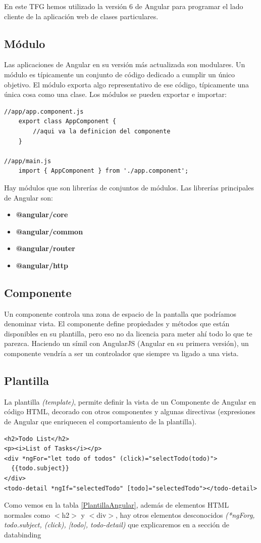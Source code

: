 En este TFG hemos utilizado la versión 6 de Angular para programar el lado cliente de la aplicación web de clases particulares.

\subsection{Módulo}
Las aplicaciones de Angular en su versión más actualizada son modulares. Un módulo es típicamente un conjunto de código dedicado a cumplir un único objetivo. El módulo exporta algo representativo de ese código, típicamente una única cosa como una clase. Los módulos se pueden exportar e importar:

\begin{lstlisting}
//app/app.component.js
    export class AppComponent {
        //aqui va la definicion del componente
    }

//app/main.js
    import { AppComponent } from './app.component';
\end{lstlisting}

Hay módulos que son librerías de conjuntos de módulos. Las librerías principales de Angular son:


\begin{itemize}
\item \textbf{@angular/core}
\item \textbf{@angular/common}
\item \textbf{@angular/router}
\item \textbf{@angular/http}
\end{itemize}


\subsection{Componente} Un componente controla una zona de espacio de la pantalla que podríamos denominar vista. El componente define propiedades y métodos que están disponibles en su plantilla, pero eso no da licencia para meter ahí todo lo que te parezca. Haciendo un símil con AngularJS (Angular en su primera versión), un componente vendría a ser un controlador que siempre va ligado a una vista.
\subsection{Plantilla} La plantilla \textit{(template)}, permite definir la vista de un Componente de Angular en código HTML, decorado con otros componentes y algunas directivas (expresiones de Angular que enriquecen el comportamiento de la plantilla).
\begin{lstlisting}[caption=Plantilla en Angular, label=PlantillaAngular]
<h2>Todo List</h2>
<p><i>List of Tasks</i></p>
<div *ngFor="let todo of todos" (click)="selectTodo(todo)">
  {{todo.subject}}
</div>
<todo-detail *ngIf="selectedTodo" [todo]="selectedTodo"></todo-detail>
\end{lstlisting}
Como vemos en la tabla \ref{PlantillaAngular}, además de elementos HTML normales como $<$h2$>$ y $<$div$>$, hay otros elementos desconocidos \textit{(*ngForg, todo.subject, (click), [todo], todo-detail)}  que explicaremos en a sección de databinding

